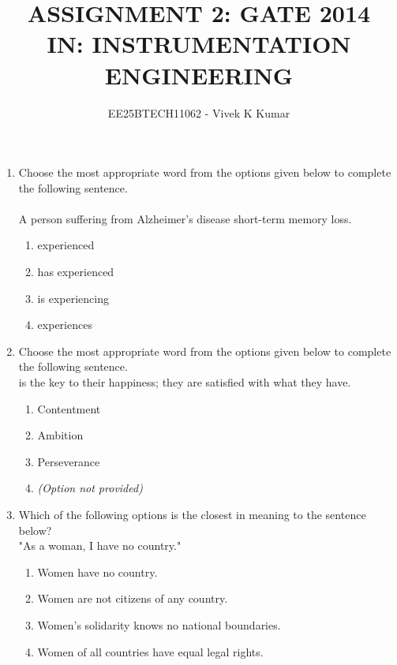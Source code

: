 \documentclass[journal,12pt,onecolumn]{IEEEtran}
\theoremstyle{remark}
\begin{document}
\title{
ASSIGNMENT 2: GATE 2014 \\
IN: INSTRUMENTATION ENGINEERING}
\author{EE25BTECH11062 - Vivek K Kumar}
\date{}
\maketitle

\begin{enumerate}

    \item Choose the most appropriate word from the options given below to complete the following sentence. \\
    \\
    A person suffering from Alzheimer's disease \underline{\hspace{2cm}} short-term memory loss.
    \begin{multicols}{2}
        \begin{enumerate}
            \item experienced
            \item has experienced
            \item is experiencing
            \item experiences
        \end{enumerate}
    \end{multicols}

    \item Choose the most appropriate word from the options given below to complete the following sentence. \\
    \underline{\hspace{2cm}} is the key to their happiness; they are satisfied with what they have.
    \begin{multicols}{2}
        \begin{enumerate}
            \item Contentment
            \item Ambition
            \item Perseverance
            \item \textit{(Option not provided)}
        \end{enumerate}
    \end{multicols}

    \item Which of the following options is the closest in meaning to the sentence below? \\
    "As a woman, I have no country."
    \begin{enumerate}
        \item Women have no country.
        \item Women are not citizens of any country.
        \item Women's solidarity knows no national boundaries.
        \item Women of all countries have equal legal rights.
    \end{enumerate}


\end{enumerate}
\end{document}
